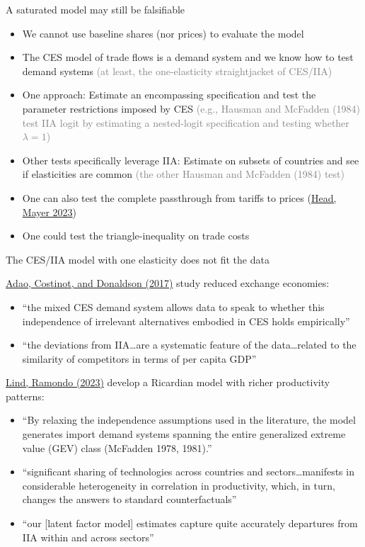 \documentclass[11pt,notes=hide,aspectratio=169]{beamer}
\begin{document}
\begin{frame}{A saturated model may still be falsifiable}
\begin{itemize}
\item We cannot use baseline shares (nor prices) to evaluate the model
\item The CES model of trade flows is a demand system and we know how to test demand systems
\textcolor{gray}{(at least, the one-elasticity straightjacket of CES/IIA)}
\item One approach: Estimate an encompassing specification and test the parameter restrictions imposed by CES
\textcolor{gray}{(e.g., Hausman and McFadden (1984) test IIA logit by estimating a nested-logit specification and testing whether $\lambda = 1$)}
\item Other tests specifically leverage IIA:
Estimate on subsets of countries and see if elasticities are common
\textcolor{gray}{(the other Hausman and McFadden (1984) test)}
\item One can also test the complete passthrough from tariffs to prices (\href{https://direct.mit.edu/rest/article/doi/10.1162/rest_a_01369/117708/Poor-Substitutes-Counterfactual-Methods-in-IO-and}{Head, Mayer 2023})
\item One could test the triangle-inequality on trade costs
\end{itemize}
\end{frame}
\begin{frame}{The CES/IIA model with one elasticity does not fit the data}
{\small
\href{https://www.aeaweb.org/articles?id=10.1257/aer.20150956}{Adao, Costinot, and Donaldson (2017)} study reduced exchange economies:
\begin{itemize}
\item ``the mixed CES demand system allows data to speak to whether this independence of irrelevant alternatives embodied in CES holds empirically''
\item ``the deviations from IIA\dots are a systematic feature of the data\dots related to the similarity of competitors in terms of per capita GDP''
\end{itemize}
\href{https://www.aeaweb.org/articles?id=10.1257/aer.20190781}{Lind, Ramondo (2023)} develop a Ricardian model with richer productivity patterns:
\begin{itemize}
\item ``By relaxing the independence assumptions used in the literature, the model generates import demand systems spanning the entire generalized extreme value (GEV) class (McFadden 1978, 1981).''
\item ``significant sharing of technologies across countries and sectors\dots manifests in considerable heterogeneity in correlation in productivity, which, in turn, changes the answers to standard counterfactuals''
\item ``our [latent factor model] estimates capture quite accurately departures from IIA within and across sectors''
\end{itemize}
}\end{frame}
\end{document}
